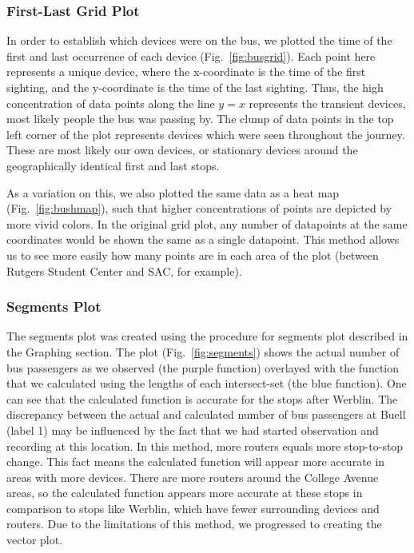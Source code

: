 \subsubsection*{First-Last Grid Plot}

In order to establish which devices were on the bus, we plotted the time of the first and last occurrence of each device (Fig.~\ref{fig:busgrid}).
Each point here represents a unique device, where the x-coordinate is the time of the first sighting, and the y-coordinate is the time of the last sighting.
Thus, the high concentration of data points along the line \(y=x\) represents the transient devices, most likely people the bus was passing by.
The clump of data points in the top left corner of the plot represents devices which were seen throughout the journey.
These are most likely our own devices, or stationary devices around the geographically identical first and last stops.

As a variation on this, we also plotted the same data as a heat map (Fig.~\ref{fig:bushmap}), such that higher concentrations of points are depicted by more vivid colors.
In the original grid plot, any number of datapoints at the same coordinates would be shown the same as a single datapoint.
This method allows us to see more easily how many points are in each area of the plot (between Rutgers Student Center and SAC, for example).

\subsubsection*{Segments Plot}
The segments plot was created using the procedure for segments plot described in the Graphing section.
The plot (Fig.~\ref{fig:segments}) shows the actual number of bus passengers as we observed (the purple function) overlayed with the function that we calculated using the lengths of each intersect-set (the blue function).
One can see that the calculated function is accurate for the stops after Werblin.
The discrepancy between the actual and calculated number of bus passengers at Buell (label 1) may be influenced by the fact that we had started observation and recording at this location. In this method, more routers equals more stop-to-stop change.
This fact means the calculated function will appear more accurate in areas with more devices.
There are more routers around the College Avenue areas, so the calculated function appears more accurate at these stops in comparison to stops like Werblin, which have fewer surrounding devices and routers.
Due to the limitations of this method, we progressed to creating the vector plot.


